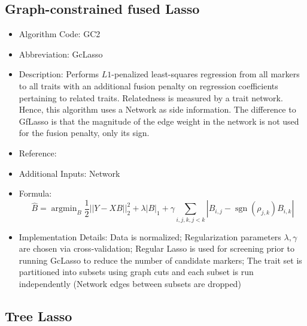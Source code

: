 \documentclass{article}
\newcommand{\sgn}{\operatorname{sgn}}
\newcommand{\argmin}{\operatorname{argmin}}
\begin{document}
\subsection{Graph-constrained fused Lasso}

\begin{itemize}
\item Algorithm Code: GC2
\item Abbreviation: GcLasso
\item Description: Performs $L1$-penalized least-squares regression from all markers to all traits with an additional fusion penalty on regression coefficients pertaining to related traits. Relatedness is measured by a trait network. Hence, this algorithm uses a Network as side information. The difference to GfLasso is that the magnitude of the edge weight in the network is not used for the fusion penalty, only its sign.
\item Reference: \cite{GfLasso}
\item Additional Inputs: Network
\item Formula:
\begin{equation*}
\hat{B} = \argmin_{B} \frac{1}{2}||Y - XB||_2^2 + \lambda|B|_1 + \gamma\sum_{i,j,k, j < k}|B_{i,j} - \sgn(\rho_{j,k})B_{i,k}|
\end{equation*}
\item Implementation Details: Data is normalized; Regularization parameters $\lambda, \gamma$ are chosen via cross-validation; Regular Lasso is used for screening prior to running GcLasso to reduce the number of candidate markers; The trait set is partitioned into subsets using graph cuts and each subset is run independently (Network edges between subsets are dropped)
\end{itemize}

\subsection{Tree Lasso}
\end{document}
